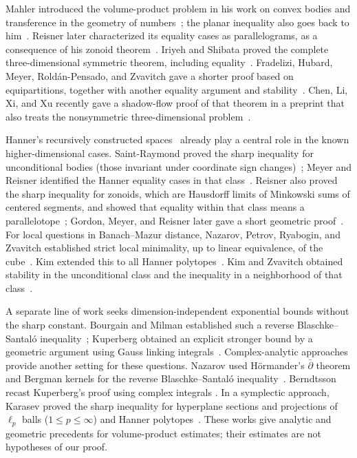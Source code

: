 Mahler introduced the volume-product problem in his work on convex
bodies and transference in the geometry of numbers~\cite{Mahler1939};
the planar inequality also goes back to him~\cite{MahlerPlanar1939}.
Reisner later characterized its equality cases as parallelograms,
as a consequence of his zonoid theorem~\cite[p.~340]{Reisner1986}.
Iriyeh and Shibata proved the complete three-dimensional symmetric
theorem, including equality~\cite[Theorem~1.1]{IriyehShibata}.
Fradelizi, Hubard, Meyer, Rold\'an-Pensado, and Zvavitch gave a
shorter proof based on equipartitions, together with another equality
argument and stability~\cite{FradeliziHubardMeyerRoldanZvavitch2022}.
Chen, Li, Xi, and Xu recently gave a shadow-flow proof of that theorem
in a preprint that also treats the nonsymmetric three-dimensional
problem~\cite[Theorem~7.1]{ChenLiXiXu2026}.

Hanner's recursively constructed spaces~\cite{Hanner1956} already
play a central role in the known higher-dimensional cases.
Saint-Raymond proved the sharp inequality for unconditional bodies
(those invariant under coordinate sign changes)~\cite{SaintRaymond1981};
Meyer and Reisner identified the Hanner equality cases in that
class~\cite{Meyer1986,Reisner1987}. Reisner also proved the sharp
inequality for zonoids, which are Hausdorff limits of Minkowski sums of
centered segments, and showed that equality within that class means a
parallelotope~\cite{Reisner1985,Reisner1986}; Gordon, Meyer, and
Reisner later gave a short geometric proof~\cite{GordonMeyerReisner1988}.
For local questions in Banach--Mazur distance, Nazarov, Petrov,
Ryabogin, and Zvavitch established strict local minimality, up to
linear equivalence, of the cube~\cite{NazarovPetrovRyaboginZvavitch2010}.
Kim extended this to all Hanner polytopes~\cite{Kim2014}.
Kim and Zvavitch obtained stability
in the unconditional class and the inequality in a neighborhood of
that class~\cite{KimZvavitch2015}.

A separate line of work seeks dimension-independent exponential
bounds without the sharp constant. Bourgain and Milman established
such a reverse Blaschke--Santal\'o inequality~\cite{BourgainMilman};
Kuperberg obtained an explicit stronger bound by a geometric argument
using Gauss linking integrals~\cite{Kuperberg}. Complex-analytic
approaches provide another setting for these questions. Nazarov used
H\"ormander's $\bar\partial$ theorem and Bergman kernels for the
reverse Blaschke--Santal\'o inequality~\cite{Nazarov2012}.
Berndtsson recast Kuperberg's proof using complex integrals
\cite{Berndtsson}. In a symplectic approach, Karasev proved the sharp
inequality for hyperplane sections and projections of $\ell_p$ balls
($1\le p\le\infty$) and Hanner polytopes~\cite[Theorems~4.2 and~4.4]{Karasev}.
These works give analytic and geometric precedents for volume-product
estimates; their estimates are not hypotheses of our proof.

